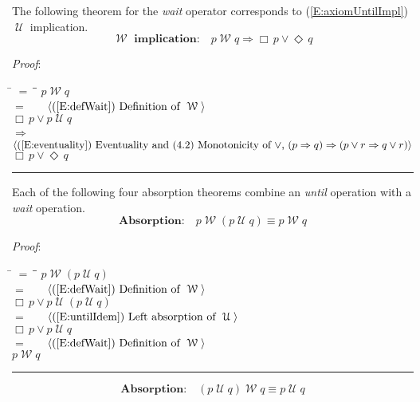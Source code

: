 \documentclass[12pt, fleqn, leqno]{article}
\newcommand{\lgap}{2pt}                             %
\newcommand{\mymathindent}{24pt}                    %
\newcommand{\impl}{\ensuremath{\Rightarrow}}        %
\newcommand{\Until}{\;\mathcal{U}\;}
\newcommand{\Wait}{\;\mathcal{W}\;}
\newcommand{\Event}{\Diamond\,}
\newcommand{\Always}{\Box\,}
\newcommand{\myqed}{\rule[-.23ex]{1.2ex}{2.0ex}}
\newcommand{\myqedtab}{\hspace{384pt}}              %
\newcommand{\Gll} {\langle}                         %
\newcommand{\Ggg} {\rangle}                         %
\newcommand{\Hint}[1]     {\ \ \ $\Gll              \mbox{#1} \Ggg$ }   %
\begin{document}
The following theorem for the \textit{wait} operator corresponds to (\ref{E:axiomUntilImpl}) $\Until$ implication.
\begin{equation}\label{E:waitEntailment}
\textbf{$\Wait$ implication:}\quad p \Wait q \impl \Always p\lor \Event q
\end{equation}

\emph{Proof}:
\begin{tabbing}
\hspace{\mymathindent} \= $= \;$ \= \myqedtab \= \kill
\> \> $p \Wait q$\\[\lgap]
\> $=$ \> \Hint{(\ref{E:defWait}) Definition of $\Wait$} \\[\lgap]
\> \> $\Always p\lor p \Until q$\\[\lgap]
\> $\impl$ \> \Hint{(\ref{E:eventuality}) Eventuality and (4.2) Monotonicity of $\lor$, $(p\impl q) \impl (p\lor r \impl q\lor r)$} \\[\lgap]
\> \> $\Always p\lor \Event q$ \quad \myqed
\end{tabbing}

Each of the following four absorption theorems combine an \textit{until} operation with a \textit{wait} operation.
\begin{equation}\label{E:leftWaitAbsUtil}
\textbf{Absorption:}\quad p \Wait (p \Until q) \equiv p \Wait q
\end{equation}

\emph{Proof}:
\begin{tabbing}
\hspace{\mymathindent} \= $= \;$ \= \myqedtab \= \kill
\> \> $p \Wait (p \Until q)$\\[\lgap]
\> $=$ \> \Hint{(\ref{E:defWait}) Definition of $\Wait$} \\[\lgap]
\> \> $\Always p\lor p \Until (p \Until q)$\\[\lgap]
\> $=$ \> \Hint{(\ref{E:untilIdem}) Left absorption of $\Until$} \\[\lgap]
\> \> $\Always p\lor p \Until q$\\[\lgap]
\> $=$ \> \Hint{(\ref{E:defWait}) Definition of $\Wait$} \\[\lgap]
\> \> $p \Wait q$ \quad \myqed
\end{tabbing}
\begin{equation}\label{E:rightWaitAbsUtil}
\textbf{Absorption:}\quad (p \Until q) \Wait q \equiv p \Until q
\end{equation}
\end{document}
